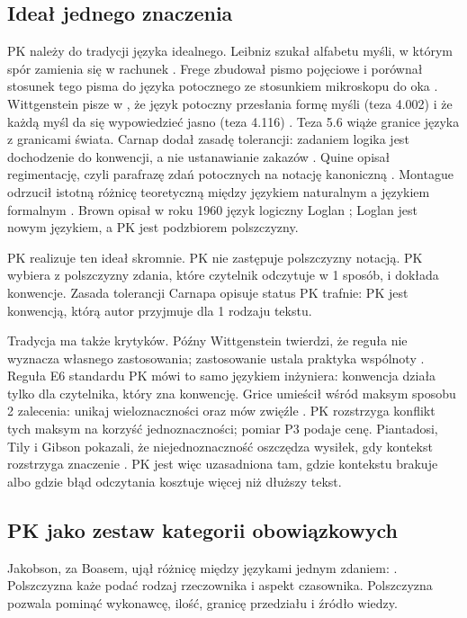 \subsection{Ideał jednego znaczenia}

PK należy do tradycji języka idealnego. Leibniz szukał alfabetu myśli, w którym spór
zamienia się w rachunek \cite{leibniz1666}. Frege zbudował pismo pojęciowe i porównał
stosunek tego pisma do języka potocznego ze stosunkiem mikroskopu do oka
\cite{frege1879}. Wittgenstein pisze w , że język
potoczny przesłania formę myśli (teza 4.002) i że każdą myśl da się wypowiedzieć jasno
(teza 4.116) \cite{wittgenstein1921}. Teza 5.6 wiąże granice języka z granicami świata.
Carnap dodał zasadę tolerancji: zadaniem logika jest dochodzenie do konwencji, a nie
ustanawianie zakazów \cite{carnap1934}. Quine opisał regimentację, czyli parafrazę zdań
potocznych na notację kanoniczną \cite{quine1960}. Montague odrzucił istotną różnicę
teoretyczną między językiem naturalnym a językiem formalnym \cite{montague1970}. Brown opisał
w roku 1960 język logiczny Loglan \cite{brown1960}; Loglan jest nowym językiem, a PK jest
podzbiorem polszczyzny.

PK realizuje ten ideał skromnie. PK nie zastępuje polszczyzny notacją. PK wybiera
z polszczyzny zdania, które czytelnik odczytuje w 1 sposób, i dokłada konwencje. Zasada
tolerancji Carnapa opisuje status PK trafnie: PK jest konwencją, którą autor przyjmuje
dla 1 rodzaju tekstu.

Tradycja ma także krytyków. Późny Wittgenstein twierdzi, że reguła nie wyznacza własnego
zastosowania; zastosowanie ustala praktyka wspólnoty \cite{wittgenstein1953}. Reguła E6
standardu PK mówi to samo językiem inżyniera: konwencja działa tylko dla czytelnika,
który zna konwencję. Grice umieścił wśród maksym sposobu 2 zalecenia: unikaj
wieloznaczności oraz mów zwięźle \cite{grice1975}. PK rozstrzyga konflikt tych maksym na
korzyść jednoznaczności; pomiar P3 podaje cenę. Piantadosi, Tily i Gibson pokazali, że
niejednoznaczność oszczędza wysiłek, gdy kontekst rozstrzyga znaczenie
\cite{piantadosi2012}. PK jest więc uzasadniona tam, gdzie kontekstu brakuje albo gdzie
błąd odczytania kosztuje więcej niż dłuższy tekst.

\subsection{PK jako zestaw kategorii obowiązkowych}

Jakobson, za Boasem, ujął różnicę między językami jednym zdaniem: 
\cite{jakobson1959}. Polszczyzna każe podać rodzaj rzeczownika i aspekt czasownika.
Polszczyzna pozwala pominąć wykonawcę, ilość, granicę przedziału i źródło wiedzy.

